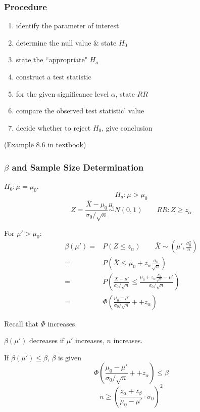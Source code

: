 \subsubsection{Procedure}
\begin{enumerate}
\item identify the parameter of interest
\item determine the null value \& state $H_0$
\item state the ``appropriate" $H_a$
\item construct a test statistic
\item for the given significance level $\alpha$, state $RR$
\item compare the observed test statistic' value
\item decide whether to reject $H_0$, give conclusion
\end{enumerate}

\begin{exmp}
(Example 8.6 in textbook)
\end{exmp}

\subsubsection{$\beta$ and Sample Size Determination}
$H_0:\mu=\mu_0$. 
\[H_a:\mu >\mu_0\]
\[Z=\frac{\bar{X}-\mu_0}{\sigma_0/\sqrt{n}}\overset{H_0}{\sim} N(0,1) \qquad RR: Z\geq z_{\alpha}\]

For $\mu'>\mu_0$: 
\begin{align*}
\beta(\mu')= & P(Z\leq z_{\alpha}) \qquad \bar{X}\sim \left(\mu',\frac{\sigma_0^2}{n}\right) \\
= & P\left(\bar{X}\leq \mu_0+z_{\alpha}\frac{\sigma_0}{\sqrt{n}}\right) \\
= & P\left( \frac{\bar{X}-\mu'}{\sigma_0/\sqrt{n}} \leq \frac{\mu_0+z_{\alpha} \frac{\sigma_0}{\sqrt{n}}-\mu'}	{\sigma_0/\sqrt{n} } \right) \\
= & \Phi\left( \frac{\mu_0-\mu'}	{\sigma_0/\sqrt{n} }++z_{\alpha}  \right)
\end{align*}

Recall that $\Phi$ increases.

$\beta(\mu')$ decreases if $\mu'$ increases, $n$ increases.

If $\beta(\mu')\leq \beta$, $\beta$ is given
\[ \Phi\left( \frac{\mu_0-\mu'}	{\sigma_0/\sqrt{n} }++z_{\alpha}  \right)\leq \beta\]
\[n \geq \left(\frac{z_{\alpha}+ z_{\beta}}{\mu_0-\mu'}\cdot\sigma_0\right)^2\]

